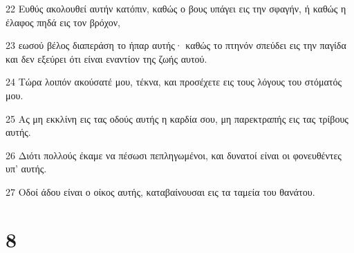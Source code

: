 \par 22 Ευθύς ακολουθεί αυτήν κατόπιν, καθώς ο βους υπάγει εις την σφαγήν, ή καθώς η έλαφος πηδά εις τον βρόχον,
\par 23 εωσού βέλος διαπεράση το ήπαρ αυτής· καθώς το πτηνόν σπεύδει εις την παγίδα και δεν εξεύρει ότι είναι εναντίον της ζωής αυτού.
\par 24 Τώρα λοιπόν ακούσατέ μου, τέκνα, και προσέχετε εις τους λόγους του στόματός μου.
\par 25 Ας μη εκκλίνη εις τας οδούς αυτής η καρδία σου, μη παρεκτραπής εις τας τρίβους αυτής.
\par 26 Διότι πολλούς έκαμε να πέσωσι πεπληγωμένοι, και δυνατοί είναι οι φονευθέντες υπ' αυτής.
\par 27 Οδοί άδου είναι ο οίκος αυτής, καταβαίνουσαι εις τα ταμεία του θανάτου.

\chapter{8}

